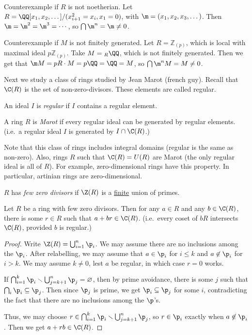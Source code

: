  \begin{example}
   Counterexample if $R$ is not noetherian. Let $R=\QQ[x_1,x_2,\dots]/(x_{i+1}^2=x_i,x_1=0)$,
   with $\m=(x_1,x_2,x_3,\dots)$. Then $\m=\m^2=\m^3=\cdots$, so $\bigcap \m^n=\m\neq 0$.
 \end{example}
 \begin{example}
   Counterexample if $M$ is not finitely generated. Let $R=\mathbb{Z}_{(p)}$, which is local
   with maximal ideal $p\mathbb{Z}_{(p)}$. Take $M={}_{R}\QQ$, which is not finitely generated.
   Then we get that $\m M= pR\cdot M = p\QQ=\QQ=M$, so $\bigcap \m^n M=M\neq 0$.
 \end{example}

 Next we study a class of rings studied by Jean Marot (french guy). Recall that $\C(R)$
 is the set of non-zero-divisors. These elements are called regular.
 \begin{definition}
   An ideal $I$ is \emph{regular} if $I$ contains a regular element.
 \end{definition}
 \begin{definition}
   A ring $R$ is \emph{Marot} if every regular ideal can be
   generated by regular elements. (i.e.\ a regular ideal $I$ is generated by $I\cap
   \C(R)$.)
 \end{definition}
 Note that this class of rings includes integral domains (regular is the same as
 non-zero). Also, rings $R$ such that $\C(R)= U(R)$ are Marot (the only regular ideal is
 all of $R$). For example, zero-dimensional rings have this property. In particular,
 artinian rings are zero-dimensional.
 \begin{definition}
   $R$ has \emph{few zero divisors} if $\Z(R)$ is a \underline{finite} union of primes.
 \end{definition}
 \begin{lemma}
   Let $R$ be a ring with few zero divisors. Then for any $a\in R$ and any $b\in \C(R)$,
   there is some $r\in R$ such that $a+br\in \C(R)$. (i.e.\ every coset of $bR$ intersects
   $\C(R)$, provided $b$ is regular.)
 \end{lemma}
 \begin{proof}
   Write $\Z(R)=\bigcup_{i=1}^n \p_i$. We may assume there are no inclusions among the
   $\p_i$. After relabelling, we may assume that $a\in \p_i$ for $i\le k$ and $a\not\in
   \p_i$ for $i>k$. We may assume $k\neq 0$, lest $a$ be regular, in which case $r=0$
   works.

   If $\bigcap_{i=1}^k\p_i\smallsetminus \bigcup_{j=k+1}^n \p_j=\varnothing$, then by
   prime avoidance, there is some $j$ such that $\bigcap_i\p_i\subseteq \p_j$. Then since
   $\p_j$ is prime, we get $\p_i\subseteq \p_j$ for some $i$, contradicting the fact that
   there are no inclusions among the $\p$'s.

   Thus, we may choose $r\in \bigcap_{i=1}^k\p_i\smallsetminus \bigcup_{j=k+1}^n \p_j$,
   so $r\in \p_i$ exactly when $a\not\in \p_i$. Then we get $a+rb\in \C(R)$.
 \end{proof}
